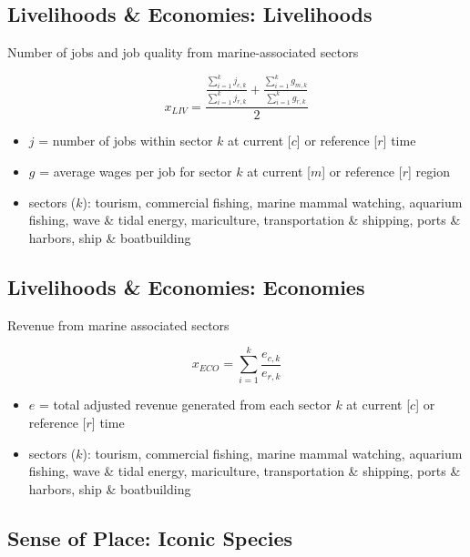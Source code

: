 \documentclass[
]{article}
\begin{document}
\hypertarget{livelihoods-economies-livelihoods}{%
\subsection{Livelihoods \& Economies:
Livelihoods}\label{livelihoods-economies-livelihoods}}

Number of jobs and job quality from marine-associated sectors

\[
x_{LIV} = \frac{\frac{\sum_{i=1}^{k} j_{c,k}}{\sum_{i=1}^{k} j_{r,k}} + \frac{\sum_{i=1}^{k} g_{m,k}}{\sum_{i=1}^{k} g_{r,k}}}{2}
\]

\begin{itemize}
\item
  \(j\) = number of jobs within sector \(k\) at current {[}\(c\){]} or
  reference {[}\(r\){]} time
\item
  \(g\) = average wages per job for sector \(k\) at current {[}\(m\){]}
  or reference {[}\(r\){]} region
\item
  sectors (\(k\)): tourism, commercial fishing, marine mammal watching,
  aquarium fishing, wave \& tidal energy, mariculture, transportation \&
  shipping, ports \& harbors, ship \& boatbuilding
\end{itemize}

\hypertarget{livelihoods-economies-economies}{%
\subsection{Livelihoods \& Economies:
Economies}\label{livelihoods-economies-economies}}

Revenue from marine associated sectors

\[
x_{ECO} = \sum_{i=1}^{k} \frac{e_{c,k}}{e_{r,k}} 
\]

\begin{itemize}
\item
  \(e\) = total adjusted revenue generated from each sector \(k\) at
  current {[}\(c\){]} or reference {[}\(r\){]} time
\item
  sectors (\(k\)): tourism, commercial fishing, marine mammal watching,
  aquarium fishing, wave \& tidal energy, mariculture, transportation \&
  shipping, ports \& harbors, ship \& boatbuilding
\end{itemize}

\hypertarget{sense-of-place-iconic-species}{%
\subsection{Sense of Place: Iconic
Species}\label{sense-of-place-iconic-species}}
\end{document}
